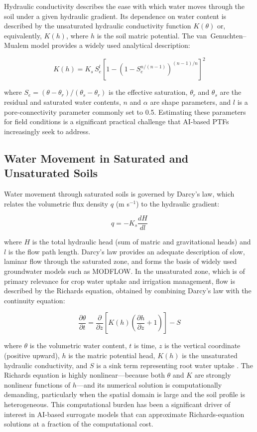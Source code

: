 \documentclass[land,article,submit,pdftex,moreauthors]{Definitions/mdpi}
\numberwithin{equation}{section}
\begin{document}
Hydraulic conductivity describes the ease with which water moves through the soil under a given hydraulic gradient. Its dependence on water content is described by the unsaturated hydraulic conductivity function $K(\theta)$ or, equivalently, $K(h)$, where $h$ is the soil matric potential. The van~Genuchten--Mualem model \citep{vangenuchten1980closed} provides a widely used analytical description:

\begin{equation}
K(h) = K_s \, S_e^{l} \left[1 - \left(1 - S_e^{n/(n-1)}\right)^{(n-1)/n}\right]^2
\end{equation}

\noindent where $S_e = (\theta - \theta_r)/(\theta_s - \theta_r)$ is the effective saturation, $\theta_r$ and $\theta_s$ are the residual and saturated water contents, $n$ and $\alpha$ are shape parameters, and $l$ is a pore-connectivity parameter commonly set to 0.5. Estimating these parameters for field conditions is a significant practical challenge that AI-based PTFs increasingly seek to address.

\subsection{Water Movement in Saturated and Unsaturated Soils}

Water movement through saturated soils is governed by Darcy's law, which relates the volumetric flux density $q$ (m s$^{-1}$) to the hydraulic gradient:

\begin{equation}
q = -K_s \frac{dH}{dl}
\end{equation}

\noindent where $H$ is the total hydraulic head (sum of matric and gravitational heads) and $l$ is the flow path length. Darcy's law provides an adequate description of slow, laminar flow through the saturated zone, and forms the basis of widely used groundwater models such as MODFLOW. In the unsaturated zone, which is of primary relevance for crop water uptake and irrigation management, flow is described by the Richards equation, obtained by combining Darcy's law with the continuity equation:

\begin{equation}
\frac{\partial \theta}{\partial t} = \frac{\partial}{\partial z}\left[K(h)\left(\frac{\partial h}{\partial z} + 1\right)\right] - S
\end{equation}

\noindent where $\theta$ is the volumetric water content, $t$ is time, $z$ is the vertical coordinate (positive upward), $h$ is the matric potential head, $K(h)$ is the unsaturated hydraulic conductivity, and $S$ is a sink term representing root water uptake \citep{richards1931capillary}. The Richards equation is highly nonlinear---because both $\theta$ and $K$ are strongly nonlinear functions of $h$---and its numerical solution is computationally demanding, particularly when the spatial domain is large and the soil profile is heterogeneous. This computational burden has been a significant driver of interest in AI-based surrogate models that can approximate Richards-equation solutions at a fraction of the computational cost.
\end{document}
